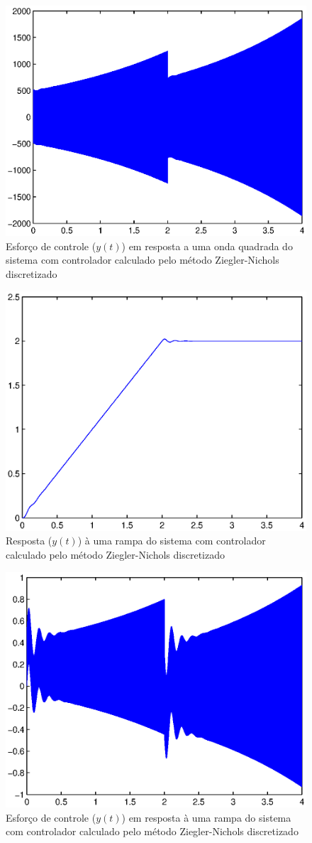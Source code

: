 \documentclass{article}
\begin{document}
	\begin{figure}[H]
	\centering
	\includegraphics[width=0.8\linewidth]{stepuZN}
	\caption{Esforço de controle ($y(t)$) em resposta a uma onda quadrada do sistema com controlador calculado pelo método Ziegler-Nichols discretizado}
	\label{fig:stepuZN}
	\end{figure}
	\begin{figure}[H]
		\centering
		\includegraphics[width=0.8\linewidth]{rampZN}
		\caption{Resposta ($y(t)$) à uma rampa do sistema com controlador calculado pelo método Ziegler-Nichols discretizado}
		\label{fig:rampZN}
	\end{figure}
	\begin{figure}[H]
		\centering
		\includegraphics[width=0.8\linewidth]{rampuZN}
		\caption{Esforço de controle ($y(t)$) em resposta à uma rampa do sistema com controlador calculado pelo método Ziegler-Nichols discretizado}
		\label{fig:rampuZN}
	\end{figure}
\end{document}
